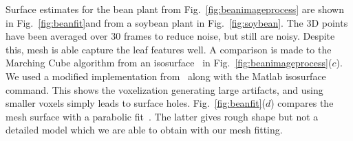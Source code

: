 Surface estimates for the bean plant from Fig.~\ref{fig:beanimageprocess} are shown in Fig.~\ref{fig:beanfit}and from a soybean plant in Fig.~\ref{fig:soybean}.   The 3D points have been averaged over 30 frames to reduce noise, but still are noisy.  Despite this, mesh is able capture the leaf features well.  A comparison is made to the Marching Cube algorithm from an isosurface~\cite{Curless:1996} in Fig.~\ref{fig:beanimageprocess}($c$).  We used a modified implementation from~\cite{PVT2013} along with the Matlab isosurface command.  This shows the voxelization generating large artifacts, and using smaller voxels simply leads to surface holes.  Fig.~\ref{fig:beanfit}($d$) compares the mesh surface with a parabolic fit~\cite{Alenya2011}.  The latter gives rough shape but not a detailed model which we are able to obtain with our mesh fitting.
